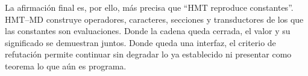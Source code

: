 La afirmaci\'on final es, por ello, m\'as precisa que ``HMT reproduce
constantes''. HMT--MD construye operadores, caracteres, secciones y
transductores de los que las constantes son evaluaciones. Donde la cadena
queda cerrada, el valor y su significado se demuestran juntos. Donde queda una
interfaz, el criterio de refutación permite continuar sin degradar lo ya establecido ni
presentar como teorema lo que a\'un es programa.
